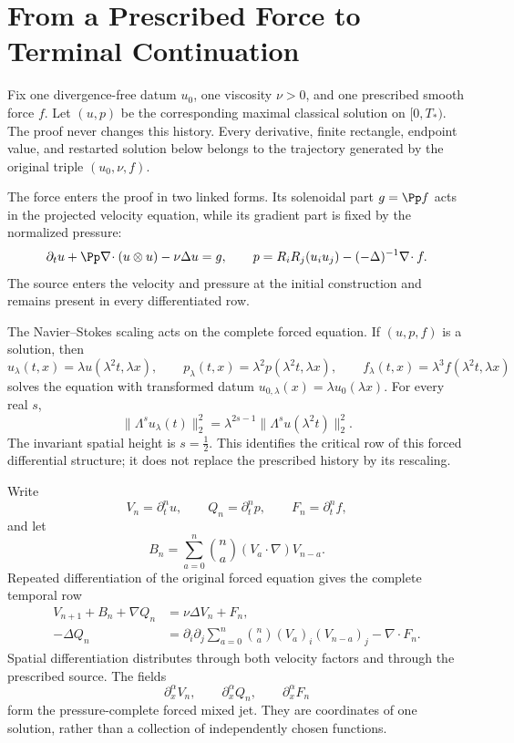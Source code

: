 \section{From a Prescribed Force to Terminal Continuation}
\label{f:sec:forced-argument-overview}
\label{f:guide:how-proof-works}

Fix one divergence-free datum \(u_0\), one viscosity \(\nu>0\), and one
prescribed smooth force \(f\).  Let \((u,p)\) be the corresponding maximal
classical solution on \([0,T_*)\).  The proof never changes this history.
Every derivative, finite rectangle, endpoint value, and restarted solution
below belongs to the trajectory generated by the original triple
\((u_0,\nu,f)\).

The force enters the proof in two linked forms.  Its solenoidal part
\(g=\Pp f\) acts in the projected velocity equation, while its gradient part
is fixed by the normalized pressure:
\[
 \partial_tu+\Pp\nabla\!\cdot(u\otimes u)-\nu\Delta u=g,
 \qquad
 p=R_iR_j(u_i u_j)-(-\Delta)^{-1}\nabla\!\cdot f.
\]
The source enters the velocity and pressure at the initial
construction and remains present in every differentiated row.

The Navier--Stokes scaling acts on the complete forced equation.  If
\((u,p,f)\) is a solution, then
\[
 u_\lambda(t,x)=\lambda u(\lambda^2t,\lambda x),\qquad
 p_\lambda(t,x)=\lambda^2p(\lambda^2t,\lambda x),\qquad
 f_\lambda(t,x)=\lambda^3f(\lambda^2t,\lambda x)
\]
solves the equation with transformed datum
\(u_{0,\lambda}(x)=\lambda u_0(\lambda x)\).  For every real \(s\),
\[
 \|\Lambda^su_\lambda(t)\|_2^2
 =\lambda^{2s-1}\|\Lambda^su(\lambda^2t)\|_2^2.
\]
The invariant spatial height is \(s=\tfrac12\).  This identifies
the critical row of this forced differential structure; it does not
replace the prescribed history by its rescaling.

Write
\[
 V_n=\partial_t^nu,\qquad Q_n=\partial_t^np,
 \qquad F_n=\partial_t^nf,
\]
and let
\[
 B_n=\sum_{a=0}^n\binom na(V_a\cdot\nabla)V_{n-a}.
\]
Repeated differentiation of the original forced equation gives the complete
temporal row
\begin{align}
 V_{n+1}+B_n+\nabla Q_n&=\nu\Delta V_n+F_n,
 \label{f:eq:guide-forced-row}\\
 -\Delta Q_n
 &=\partial_i\partial_j\sum_{a=0}^n\binom na
      (V_a)_i(V_{n-a})_j-\nabla\!\cdot F_n.
 \label{f:eq:guide-forced-pressure}
\end{align}
Spatial differentiation distributes through both velocity factors and through
the prescribed source.  The fields
\[
 \partial_x^\alpha V_n,\qquad
 \partial_x^\alpha Q_n,\qquad
 \partial_x^\alpha F_n
\]
form the pressure-complete forced mixed jet.  They are coordinates of one
solution, rather than a collection of independently chosen functions.

